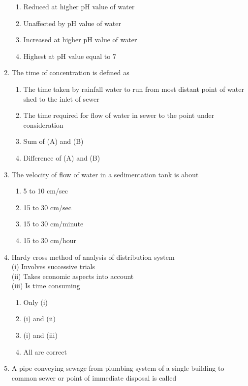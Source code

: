 \documentclass[11pt,a4paper]{article}
\begin{document}
\begin{enumerate}
\begin{enumerate}[label=\Alph*.]
\item{Reduced at higher pH value of water}
\item{Unaffected by pH value of water}
\item{Increased at higher pH value of water}
\item{Highest at pH value equal to 7}
\end{enumerate}
\item{The time of concentration is defined as}
\begin{enumerate}[label=\Alph*.]
\item{The time taken by rainfall water to run from most distant point of water shed to the inlet of sewer}
\item{The time required for flow of water in sewer to the point under consideration}
\item{Sum of (A) and (B)}
\item{Difference of (A) and (B)}
\end{enumerate}
\item{The velocity of flow of water in a sedimentation tank is about}
\begin{enumerate}[label=\Alph*.]
\item{5 to 10 cm/sec}
\item{15 to 30 cm/sec}
\item{15 to 30 cm/minute}
\item{15 to 30 cm/hour}
\end{enumerate}
\item{Hardy cross method of analysis of distribution system \\
 (i) Involves successive trials \\
 (ii) Takes economic aspects into account \\
 (iii) Is time consuming}
\begin{enumerate}[label=\Alph*.]
\item{Only (i)}
\item{(i) and (ii)}
\item{(i) and (iii)}
\item{All are correct}
\end{enumerate}
\item{A pipe conveying sewage from plumbing system of a single building to common sewer or point of immediate disposal is called}
\\
\end{enumerate}
\end{document}
